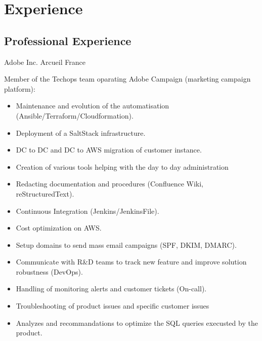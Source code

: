 \documentclass[10pt,a4paper,sans]{moderncv}        %
\begin{document}
\section{Experience}

\subsection{Professional Experience}
              {Adobe Inc.}
              {Arcueil}
              {France}
              {Member of the Techops team oparating Adobe Campaign (marketing campaign platform):
                 \begin{itemize}
                 \item Maintenance and evolution of the automatisation (Ansible/Terraform/Cloudformation).
                 \item Deployment of a SaltStack infrastructure.
                 \item DC to DC and DC to AWS migration of customer instance.
                 \item Creation of various tools helping with the day to day administration
                 \item Redacting documentation and procedures (Confluence Wiki, reStructuredText).
                 \item Continuous Integration (Jenkins/JenkinsFile).
                 \item Cost optimization on AWS.
		 \item Setup domains to send mass email campaigns (SPF, DKIM, DMARC).
                 \item Communicate with R\&D teams to track new feature and improve solution robustness (DevOps).
		 \item Handling of monitoring alerts and customer tickets (On-call).
                 \item Troubleshooting of product issues and specific customer issues
                 \item Analyzes and recommandations to optimize the SQL queries execusted by the product.
                 \end{itemize}
              }
\end{document}
